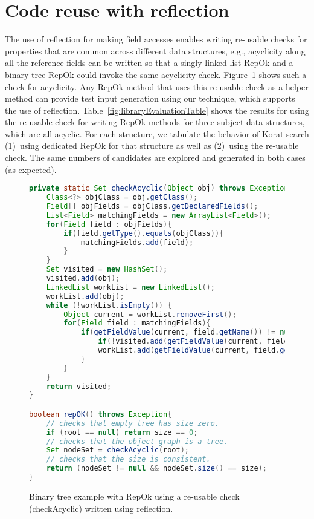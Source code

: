 \section{Code reuse with reflection}
\label{sec:code-reuse-with-reflection}
The use of reflection for making field accesses enables writing
re-usable checks for properties that are common across different data
structures, e.g., acyclicity along all the reference fields can be
written so that a singly-linked list RepOk and a binary tree RepOk
could invoke the same acyclicity check.
Figure~\ref{fig:btreeAcyclicRepOk} shows such a check for acyclicity.
Any RepOk method that uses this re-usable check as a helper method can
provide test input generation using our technique, which supports the
use of reflection.  Table~\ref{fig:libraryEvaluationTable} shows the
results for using the re-usable check for writing RepOk methods for
three subject data structures, which are all acyclic.  For each
structure, we tabulate the behavior of Korat search (1)~using
dedicated RepOk for that structure as well as (2)~using the re-usable
check.  The same numbers of candidates are explored and generated in
both cases (as expected).
\begin{figure}
\centering
\begin{lstlisting}[language=Java]
private static Set checkAcyclic(Object obj) throws Exception{
    Class<?> objClass = obj.getClass();
    Field[] objFields = objClass.getDeclaredFields();
    List<Field> matchingFields = new ArrayList<Field>();
    for(Field field : objFields){
        if(field.getType().equals(objClass)){
            matchingFields.add(field);
        }
    }
    Set visited = new HashSet();
    visited.add(obj);
    LinkedList workList = new LinkedList();
    workList.add(obj);
    while (!workList.isEmpty()) {
        Object current = workList.removeFirst();
        for(Field field : matchingFields){
            if(getFieldValue(current, field.getName()) != null){
                if(!visited.add(getFieldValue(current, field.getName()))) return null;
                workList.add(getFieldValue(current, field.getName()));
            }
        }
    }
    return visited;
}

boolean repOK() throws Exception{
    // checks that empty tree has size zero.
    if (root == null) return size == 0;
    // checks that the object graph is a tree.
    Set nodeSet = checkAcyclic(root);
    // checks that the size is consistent.
    return (nodeSet != null && nodeSet.size() == size);
}
\end{lstlisting}
\caption{Binary tree example with RepOk using a re-usable check (checkAcyclic) written using reflection.}
\label{fig:btreeAcyclicRepOk}
\end{figure}

